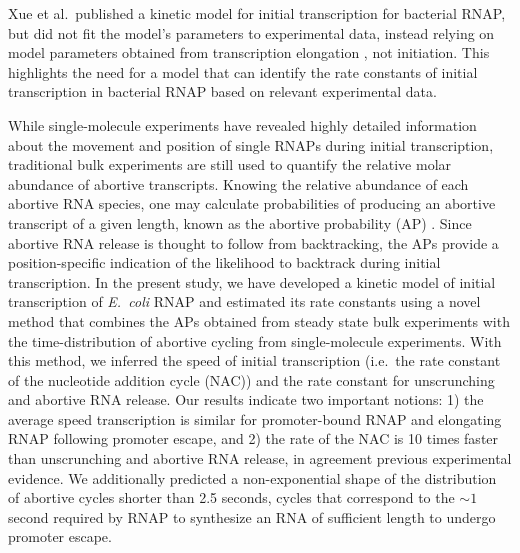Xue et al.\ published a kinetic model for initial transcription for bacterial
RNAP, but did not fit the model's parameters to experimental data, instead
relying on model parameters obtained from transcription elongation
\cite{xue_kinetic_2008}, not initiation. This highlights the need for a model
that can identify the rate constants of initial transcription in bacterial RNAP
based on relevant experimental data.

While single-molecule experiments have revealed highly detailed information
about the movement and position of single RNAPs during initial transcription,
traditional bulk experiments are still used to quantify the relative molar
abundance of abortive transcripts. Knowing the relative abundance of each
abortive RNA species, one may calculate probabilities of producing an
abortive transcript of a given length, known as the abortive probability
(AP) \cite{hsu_promoter_2002, hsu_quantitative_1996}. Since abortive RNA
release is thought to follow from backtracking, the APs provide a
position-specific indication of the likelihood to backtrack during initial
transcription. In the present study, we have developed a kinetic model of initial
transcription of \textit{E.\ coli} RNAP and estimated its rate constants using
a novel method that combines the APs obtained from steady state bulk
experiments with the time-distribution of abortive cycling from
single-molecule experiments. With this method, we inferred the speed of
initial transcription (i.e.\ the rate constant of the nucleotide addition
cycle (NAC)) and the rate constant for unscrunching and abortive RNA release.
Our results indicate two important notions: 1) the average speed transcription
is similar for promoter-bound RNAP and elongating RNAP following promoter
escape, and 2) the rate of the NAC is 10 times faster than unscrunching and
abortive RNA release, in agreement previous experimental evidence. We
additionally predicted a non-exponential shape of the distribution of abortive
cycles shorter than 2.5 seconds, cycles that correspond to the $\sim1$ second
required by RNAP to synthesize an RNA of sufficient length to undergo promoter
escape.
